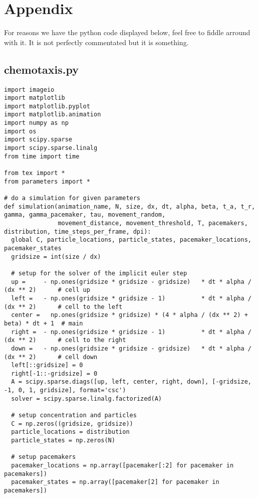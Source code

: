 \section{Appendix}

For reasons we have the python code displayed below, feel free to fiddle arround with it.
It is not perfectly commentated but it is something.

\subsection{chemotaxis.py}

\begin{verbatim}
import imageio
import matplotlib
import matplotlib.pyplot
import matplotlib.animation
import numpy as np
import os
import scipy.sparse
import scipy.sparse.linalg
from time import time

from tex import *
from parameters import *

# do a simulation for given parameters
def simulation(animation_name, N, size, dx, dt, alpha, beta, t_a, t_r, gamma, gamma_pacemaker, tau, movement_random,
               movement_distance, movement_threshold, T, pacemakers, distribution, time_steps_per_frame, dpi):
  global C, particle_locations, particle_states, pacemaker_locations, pacemaker_states
  gridsize = int(size / dx)

  # setup for the solver of the implicit euler step
  up =     - np.ones(gridsize * gridsize - gridsize)   * dt * alpha / (dx ** 2)      # cell up
  left =   - np.ones(gridsize * gridsize - 1)          * dt * alpha / (dx ** 2)      # cell to the left
  center =   np.ones(gridsize * gridsize) * (4 * alpha / (dx ** 2) + beta) * dt + 1  # main
  right =  - np.ones(gridsize * gridsize - 1)          * dt * alpha / (dx ** 2)      # cell to the right
  down =   - np.ones(gridsize * gridsize - gridsize)   * dt * alpha / (dx ** 2)      # cell down
  left[::gridsize] = 0
  right[-1::-gridsize] = 0
  A = scipy.sparse.diags([up, left, center, right, down], [-gridsize, -1, 0, 1, gridsize], format='csc')
  solver = scipy.sparse.linalg.factorized(A)

  # setup concentration and particles
  C = np.zeros((gridsize, gridsize))
  particle_locations = distribution
  particle_states = np.zeros(N)

  # setup pacemakers
  pacemaker_locations = np.array([pacemaker[:2] for pacemaker in pacemakers])
  pacemaker_states = np.array([pacemaker[2] for pacemaker in pacemakers])


\end{verbatim}
